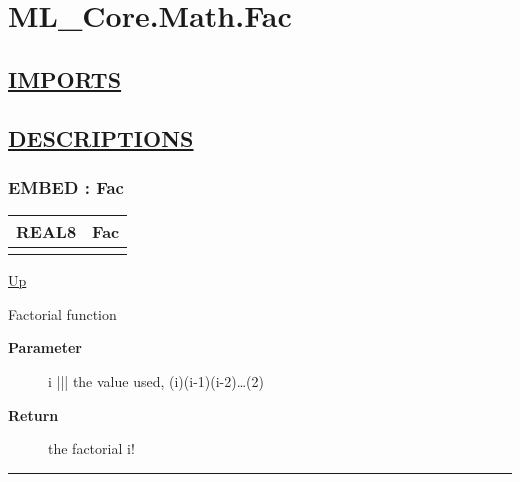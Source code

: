 \chapter*{ML\_Core.Math.Fac}
\hypertarget{ecldoc:toc:ML_Core.Math.Fac}{}

\section*{\underline{IMPORTS}}

\section*{\underline{DESCRIPTIONS}}
\subsection*{EMBED : Fac}
\hypertarget{ecldoc:ml_core.math.fac}{}

{\renewcommand{\arraystretch}{1.5}
\begin{tabularx}{\textwidth}{|>{\raggedright\arraybackslash}l|X|}
\hline
\hspace{0pt}REAL8 & Fac \\
\hline
\multicolumn{2}{|>{\raggedright\arraybackslash}X|}{\hspace{0pt}(UNSIGNED2 i)} \\
\hline
\end{tabularx}
}

\hyperlink{ecldoc:toc:ML_Core/Math}{Up}

\par
Factorial function

\par
\begin{description}
\item [\textbf{Parameter}] i ||| the value used, (i)(i-1)(i-2)\ldots(2)
\item [\textbf{Return}] the factorial i!
\end{description}

\rule{\textwidth}{0.4pt}
